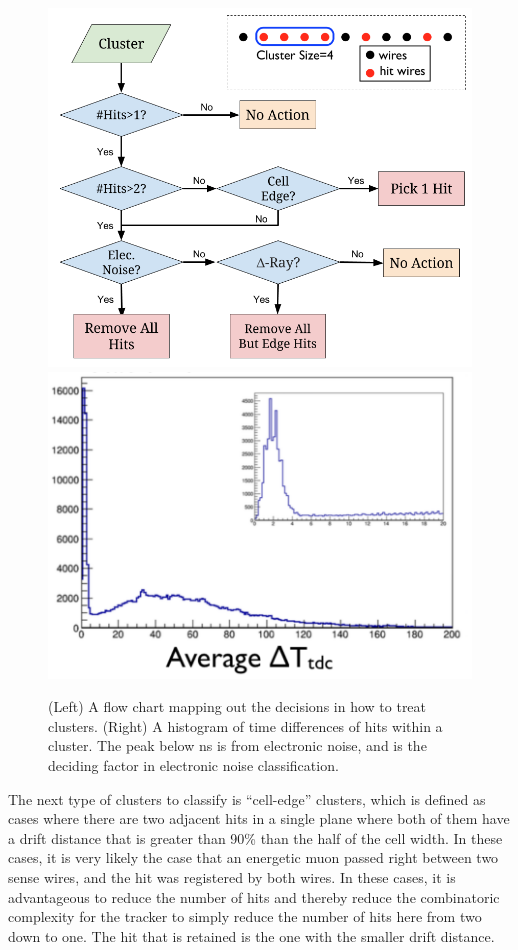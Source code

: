 \begin{figure}
	\centering
	\includegraphics[height=0.25\textheight]{figures/analysis/cluster-flow.png}
	\includegraphics[height=0.25\textheight]{figures/analysis/elec-noise-cluster.png}
	\caption{(Left) A flow chart mapping out the decisions in how to treat clusters. (Right) A histogram of time differences of hits within a cluster. The peak below \unit[10]{ns} is from electronic noise, and is the deciding factor in electronic noise classification.}
	\label{fig:cluster-flow}
\end{figure}

The next type of clusters to classify is ``cell-edge'' clusters, which is defined as cases where there are two adjacent hits in a single plane where both of them have a drift distance that is greater than 90\% than the half of the cell width. In these cases, it is very likely the case that an energetic muon passed right between two sense wires, and the hit was registered by both wires. In these cases, it is advantageous to reduce the number of hits and thereby reduce the combinatoric complexity for the tracker to simply reduce the number of hits here from two down to one. The hit that is retained is the one with the smaller drift distance.

